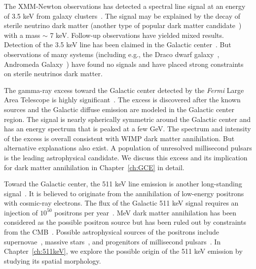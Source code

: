 \documentclass[doublespace,nopageskip]{VTthesis}
\begin{document}
The XMM-Newton observations has detected a spectral line signal at an energy of 3.5 keV from galaxy clusters~\cite{2014ApJ...789...13B}. The signal may be explained by the decay of sterile neutrino dark matter (another type of popular dark matter candidate~\cite{2002PrPNP..48..161V}) with a mass $\sim$ 7 keV. {Follow-up observations have yielded mixed results. Detection of the 3.5 keV line has been claimed in the Galactic center~\cite{2015PhRvL.115p1301B}. But observations of many systems (including e.g., the Draco dwarf galaxy~\cite{2016MNRAS.458.3592J}, Andromeda Galaxy~\cite{2014PhRvD..89b5017H}) have found no signals and have placed strong constraints on sterile neutrinos dark matter.} 

The gamma-ray excess toward the Galactic center detected by the \textit{Fermi} Large Area Telescope is highly significant~\cite{2009arXiv0910.2998G,2009arXiv0912.3828V,2011PhLB..697..412H,2012PhRvD..86h3511A,2013PhRvD..88h3521G,2014PhRvD..89f3515M,2013PDU.....2..118H,2014PhRvD..90b3526A,2016PDU....12....1D,2015JCAP...03..038C,2015PhRvD..91l3010Z,2016ApJ...819...44A,2017ApJ...840...43A}. {The excess is discovered after the known sources and the Galactic diffuse emission are modeled in the Galactic center region. The signal is nearly spherically symmetric around the Galactic center and has an energy spectrum that is peaked at a few GeV. The spectrum and intensity of the excess is overall consistent with WIMP dark matter annihilation. But alternative explanations also exist. A population of unresolved millisecond pulsars is the leading astrophysical candidate.} We discuss this excess and its implication for dark matter annihilation in Chapter~\ref{ch:GCE} in detail.

Toward the Galactic center, the 511 keV line emission is another long-standing signal~\cite{1978ApJ...225L..11L}. {It is believed to originate from the annihilation of low-energy positrons with cosmic-ray electrons. The flux of the Galactic 511 keV signal requires an injection of $10^{50}$ positrons per year~\cite{2006A&A...449..869P}. MeV dark matter annihilation has been considered as the possible positron source but has been ruled out by constraints from the CMB~\cite{2016PhRvD..94j3525W}. Possible astrophysical sources of the positrons include supernovae~\cite{2006ApJ...640L..55K}, massive stars~\cite{2019A&A...632A..73P}, and progenitors of millisecond pulsars~\cite{2018MNRAS.480.3826B}.}
In Chapter~\ref{ch:511keV}, we explore the possible origin of the 511 keV emission by studying its spatial morphology.
\end{document}
